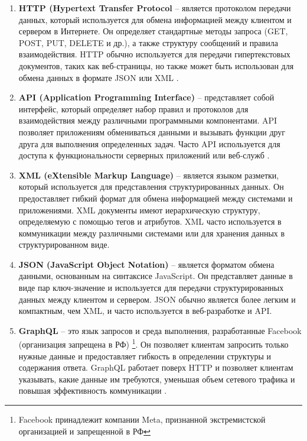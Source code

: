 \begin{enumerate}
    \item \textbf{HTTP (Hypertext Transfer Protocol} -- является протоколом передачи данных, который используется для обмена информацией между клиентом и сервером в Интернете. 
    Он определяет стандартные методы запроса (GET, POST, PUT, DELETE и др.), а также структуру сообщений и правила взаимодействия. 
    HTTP обычно используется для передачи гипертекстовых документов, таких как веб-страницы, 
    но также может быть использован для обмена данных в формате JSON или XML \cite{EasyHttp}.

    \item \textbf{API (Application Programming Interface)} -- представляет собой интерфейс, который определяет набор правил и протоколов 
    для взаимодействия между различными программными компонентами. 
    API позволяет приложениям обмениваться данными и вызывать функции друг друга для выполнения определенных задач. 
    Часто API используется для доступа к функциональности серверных приложений или веб-служб \cite{GoodAPI}.
    
    \item \textbf{XML (eXtensible Markup Language)} -- является языком разметки, который используется для представления структурированных данных. 
    Он предоставляет гибкий формат для обмена информацией между системами и приложениями. 
    XML документы имеют иерархическую структуру, определяемую с помощью тегов и атрибутов. 
    XML часто используется в коммуникации между различными системами или для хранения данных в структурированном виде.
    
    \item \textbf{JSON (JavaScript Object Notation)} -- является форматом обмена данными, основанным на синтаксисе JavaScript. 
    Он представляет данные в виде пар ключ-значение и используется для передачи структурированных данных между клиентом и сервером. 
    JSON обычно является более легким и компактным, чем XML, и часто используется в веб-разработке и API.
    
    \item \textbf{GraphQL} -- это язык запросов и среда выполнения, разработанные Facebook (организация запрещена в РФ)
    \footnote{Facebook принадлежит компании Meta, признанной экстремистской организацией и запрещенной в РФ}. 
    Он позволяет клиентам запросить только нужные данные и предоставляет гибкость в определении структуры и содержания ответа. 
    GraphQL работает поверх HTTP и позволяет клиентам указывать, какие данные им требуются, 
    уменьшая объем сетевого трафика и повышая эффективность коммуникации \cite{GraphQL}.
    
\end{enumerate}

